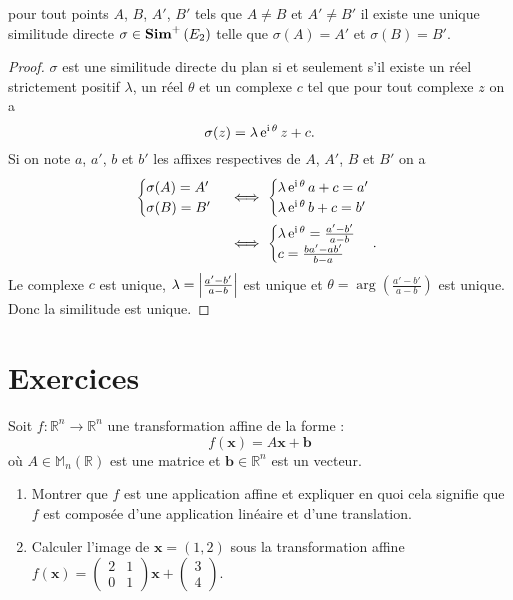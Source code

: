 \begin{prop}
  pour tout points \(A\), \(B\), \(A'\), \(B'\) tels que \(A\neq B\) et \(A'\neq 
  B'\) il existe une unique similitude directe \(\sigma\in\mathbf{Sim}^{+}\left(E_2\right)\) telle 
  que \(\sigma(A)=A'\) et \(\sigma(B)=B'\).
\end{prop}
\begin{proof}
  \(\sigma\) est une similitude directe du plan si et seulement s'il existe un 
  réel strictement positif \(\lambda\), un réel \(\theta\) et un complexe \(c\) 
  tel que pour tout complexe \(z\) on a
  \begin{equation}
    \sigma(z) = \lambda \operatorname{e}^{\operatorname{i}\theta}z+c.
  \end{equation}
  Si on note \(a\), \(a'\), \(b\) et \(b'\) les affixes respectives de \(A\), 
  \(A'\), \(B\) et \(B'\) on a
  \begin{align*}
    \begin{cases} \sigma(A)=A' \\ \sigma(B)=B'\end{cases}&\iff \begin{cases} 
  \lambda\operatorname{e}^{\operatorname{i} \theta}a+c=a' \\ \lambda\operatorname{e}^{\operatorname{i} \theta}b+c=b'\end{cases}\\
  &\iff \begin{cases} \lambda\operatorname{e}^{\operatorname{i}\theta}=\frac{a'-b'}{a-b} \\ 
  c=\frac{ba'-ab'}{b-a}\end{cases}.
\end{align*}
Le complexe \(c\) est unique, \(\lambda=\left\lvert\frac{a'-b'}{a-b}\right\rvert\) est unique et 
\(\theta=\arg\left(\frac{a'-b'}{a-b}\right)\) est unique. Donc la similitude est 
unique.
\end{proof}
\section{Exercices}
\begin{exercice}
Soit \( f : \mathbb{R}^n \to \mathbb{R}^n \) une transformation affine de la forme :
\[
f(\mathbf{x}) = A \mathbf{x} + \mathbf{b}
\]
où \( A \in \mathbb{M}_n(\mathbb{R}) \) est une matrice et \( \mathbf{b} \in \mathbb{R}^n \) est un vecteur.
\begin{enumerate}
    \item Montrer que \( f \) est une application affine et expliquer en quoi cela signifie que \( f \) est composée d'une application linéaire et d'une translation.
    \item Calculer l'image de \( \mathbf{x} = (1, 2) \) sous la transformation affine \( f(\mathbf{x}) = \begin{pmatrix} 2 & 1 \\ 0 & 1 \end{pmatrix} \mathbf{x} + \begin{pmatrix} 3 \\ 4 \end{pmatrix} \).
\end{enumerate}
\end{exercice}

